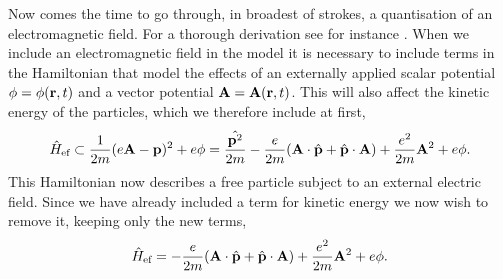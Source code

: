    Now comes the time to go through, in broadest of strokes, a quantisation of an electromagnetic 
    field. For a thorough derivation see for instance 
    \citeauthor{joachain2012atoms}\cite{joachain2012atoms}.
    When we include an electromagnetic field in the model it is necessary to include terms in
    the Hamiltonian that 
    model the effects of an externally applied scalar potential $\phi = \phi(\vb{r}, t)$
    and a vector potential $\vb{A} = \vb{A}(\vb{r}, t)$. This will also affect the 
    kinetic energy of the particles, which we therefore include at first,
    \begin{equation}
        \hat{H}_\text{ef} 
            \subset \frac{1}{2m}( e \vb{A} - \vb{p})^2 + e\phi
            = \frac{\hat{\vb{p}^2}}{2m} - \frac{e}{2m}(\vb{A}\cdot\hat{\vb{p}} + \hat{\vb{p}}\cdot\vb{A})
                + \frac{e^2}{2m}\vb{A}^2 + e\phi.
    \end{equation}
    This Hamiltonian now describes a free particle subject to an external 
    electric field. Since we have already included a term for kinetic energy we 
    now wish to remove it, keeping only the new terms,
    \begin{equation}
        \hat{H}_\text{ef} 
            = - \frac{e}{2m}(\vb{A}\cdot\hat{\vb{p}} + \hat{\vb{p}}\cdot\vb{A})
                + \frac{e^2}{2m}\vb{A}^2 + e\phi.
    \end{equation}

